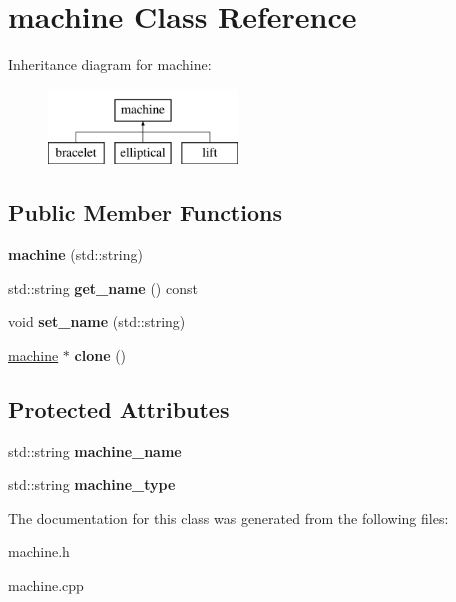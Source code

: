 \hypertarget{classmachine}{\section{machine Class Reference}
\label{classmachine}
}
Inheritance diagram for machine\-:\begin{figure}[H]
\begin{center}
\leavevmode
\includegraphics[height=2.000000cm]{classmachine}
\end{center}
\end{figure}
\subsection*{Public Member Functions}
\begin{DoxyCompactItemize}
\item 
\hypertarget{classmachine_a98793c9fe9044a6e6c12ded0ac96fcea}{{\bfseries machine} (std\-::string)}\label{classmachine_a98793c9fe9044a6e6c12ded0ac96fcea}

\item 
\hypertarget{classmachine_afb003d4605d7caec368eed19d73bb510}{std\-::string {\bfseries get\-\_\-name} () const }\label{classmachine_afb003d4605d7caec368eed19d73bb510}

\item 
\hypertarget{classmachine_a867d5d161df0799c6c4c3f5a39b594da}{void {\bfseries set\-\_\-name} (std\-::string)}\label{classmachine_a867d5d161df0799c6c4c3f5a39b594da}

\item 
\hypertarget{classmachine_a16f102ccb934d03c6cf8c2fd01da4b89}{\hyperlink{classmachine}{machine} $\ast$ {\bfseries clone} ()}\label{classmachine_a16f102ccb934d03c6cf8c2fd01da4b89}

\end{DoxyCompactItemize}
\subsection*{Protected Attributes}
\begin{DoxyCompactItemize}
\item 
\hypertarget{classmachine_aef2de447421299179c1417856bb3caa7}{std\-::string {\bfseries machine\-\_\-name}}\label{classmachine_aef2de447421299179c1417856bb3caa7}

\item 
\hypertarget{classmachine_ac158712554f0089431527276b170ff39}{std\-::string {\bfseries machine\-\_\-type}}\label{classmachine_ac158712554f0089431527276b170ff39}

\end{DoxyCompactItemize}


The documentation for this class was generated from the following files\-:\begin{DoxyCompactItemize}
\item 
machine.\-h\item 
machine.\-cpp\end{DoxyCompactItemize}
